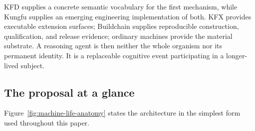 KFD supplies a concrete semantic vocabulary for the first mechanism, while
Kungfu supplies an emerging engineering implementation of both. KFX provides
executable extension surfaces; Buildchain supplies reproducible construction,
qualification, and release evidence; ordinary machines provide the material
substrate. A reasoning agent is then neither the whole organism nor its
permanent identity. It is a replaceable cognitive event participating in a
longer-lived subject.

\subsection{The proposal at a glance}

Figure~\ref{fig:machine-life-anatomy} states the architecture in the simplest
form used throughout this paper.

